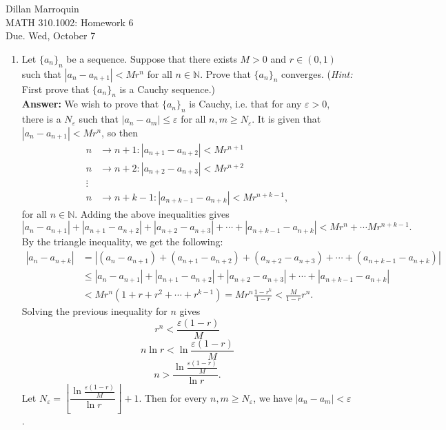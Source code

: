 \documentclass{article}
\begin{document}
    \noindent Dillan Marroquin\\ MATH 310.1002: Homework 6\\
    Due. Wed, October 7

    \begin{enumerate}
        \item Let $\{a_n\}_n$ be a sequence. Suppose that there exists $M > 0$ and $r \in (0,1)$ such that $|a_n - a_{n+1}| < Mr^n$ for all $n \in \mathbb{N}$. Prove that $\{a_n\}_n$ converges. (\textit{Hint: }First prove that $\{a_n\}_n$ is a Cauchy sequence.)\\
        \textbf{Answer: }We wish to prove that $\{a_n\}_n$ is Cauchy, i.e. that for any $\varepsilon > 0$, there is a $N_\varepsilon$ such that $|a_n-a_m| \leq \varepsilon$ for all $n,m \geq N_\varepsilon$. It is given that $|a_n-a_{n+1}| < Mr^n$, so then 
            \begin{align*}
                n &\to n+1: |a_{n+1}-a_{n+2}| < Mr^{n+1}\\
                n &\to n+2: |a_{n+2}-a_{n+3}| < Mr^{n+2}\\
                \vdots\\
                n &\to n+k-1: |a_{n+k-1}-a_{n+k}| < Mr^{n+k-1},
            \end{align*}
        for all $n \in \mathbb{N}$. Adding the above inequalities gives
            \[|a_n-a_{n+1}|+|a_{n+1}-a_{n+2}|+|a_{n+2}-a_{n+3}|+ \cdots +|a_{n+k-1}-a_{n+k}| < Mr^n + \cdots Mr^{n+k-1}.\]
        By the triangle inequality, we get the following:
            \begin{align*}
                |a_n-a_{n+k}| &= |(a_n-a_{n+1})+(a_{n+1}-a_{n+2})+(a_{n+2}-a_{n+3})+ \cdots +(a_{n+k-1}-a_{n+k})|\\
                 &\leq |a_n-a_{n+1}|+|a_{n+1}-a_{n+2}|+|a_{n+2}-a_{n+3}|+ \cdots +|a_{n+k-1}-a_{n+k}|\\
                 &< Mr^n(1+r+r^2+\cdots+r^{k-1}) = Mr^n\frac{1-r^k}{1-r} < \frac{M}{1-r}r^n.
            \end{align*}
        Solving the previous inequality for $n$ gives
            \[r^n < \frac{\varepsilon(1-r)}{M}\]
            \[n\ln{r} < \ln{\frac{\varepsilon(1-r)}{M}}\]
            \[n > \frac{\ln{\frac{\varepsilon(1-r)}{M}}}{\ln{r}}.\]
        Let $N_\varepsilon = \left \lfloor{\dfrac{\ln{\frac{\varepsilon(1-r)}{M}}}{\ln{r}}} \right \rfloor + 1$. Then for every $n,m \geq N_\varepsilon$, we have $|a_n-a_m| < \varepsilon$.\\
        

\end{enumerate}
\end{document}
